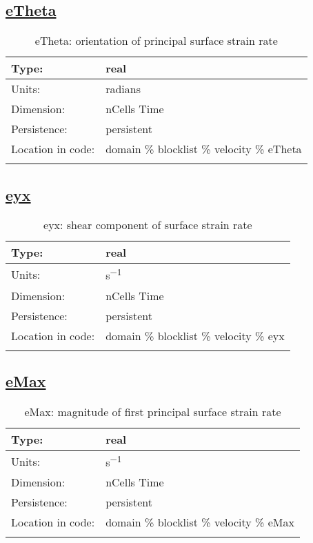 \subsection[eTheta]{\hyperref[sec:var_tab_velocity]{eTheta}}
\label{subsec:var_sec_velocity_eTheta}
\begin{center}
\begin{longtable}{| p{2.0in} | p{4.0in} |}
        \hline 
        Type: & real \\
        \hline 
        Units: & \si{radians} \\
        \hline 
        Dimension: & nCells Time \\
        \hline 
        Persistence: & persistent \\
        \hline 
         Location in code: & domain \% blocklist \% velocity \% eTheta \\
         \hline 
    \caption{eTheta: orientation of principal surface strain rate}
\end{longtable}
\end{center}
\subsection[eyx]{\hyperref[sec:var_tab_velocity]{eyx}}
\label{subsec:var_sec_velocity_eyx}
\begin{center}
\begin{longtable}{| p{2.0in} | p{4.0in} |}
        \hline 
        Type: & real \\
        \hline 
        Units: & \si{s^{-1}} \\
        \hline 
        Dimension: & nCells Time \\
        \hline 
        Persistence: & persistent \\
        \hline 
         Location in code: & domain \% blocklist \% velocity \% eyx \\
         \hline 
    \caption{eyx: shear component of surface strain rate}
\end{longtable}
\end{center}
\subsection[eMax]{\hyperref[sec:var_tab_velocity]{eMax}}
\label{subsec:var_sec_velocity_eMax}
\begin{center}
\begin{longtable}{| p{2.0in} | p{4.0in} |}
        \hline 
        Type: & real \\
        \hline 
        Units: & \si{s^{-1}} \\
        \hline 
        Dimension: & nCells Time \\
        \hline 
        Persistence: & persistent \\
        \hline 
         Location in code: & domain \% blocklist \% velocity \% eMax \\
         \hline 
    \caption{eMax: magnitude of first principal surface strain rate}
\end{longtable}
\end{center}
